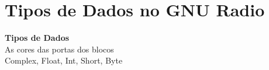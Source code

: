 \documentclass[aspectratio=169]{beamer}
\begin{document}
\section{Tipos de Dados no GNU Radio}

{
\begin{frame}[plain,c]
\begin{center}
{\Huge\textbf{Tipos de Dados}}\\[0.8cm]
{\LARGE As cores das portas dos blocos}\\[0.5cm]
{\large Complex, Float, Int, Short, Byte}
\end{center}
\end{frame}
}
\end{document}
